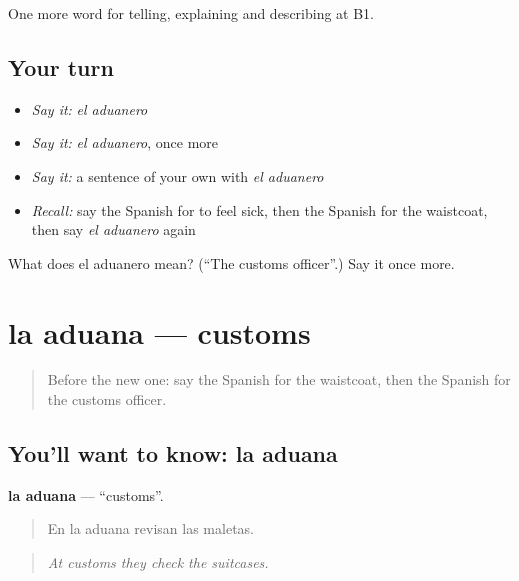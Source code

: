 \begin{grammarlens}[title={What you've built}]
One more word for telling, explaining and describing at B1.
\end{grammarlens}

\subsection*{Your turn}
\begin{itemize}
\raggedright
  \item \emph{Say it:} \emph{el aduanero}
  \item \emph{Say it:} \emph{el aduanero}, once more
  \item \emph{Say it:} a sentence of your own with \emph{el aduanero}
  \item \emph{Recall:} say the Spanish for to feel sick, then the Spanish for the waistcoat, then say \emph{el aduanero} again
\end{itemize}

\begin{tcolorbox}[breakable,colback=teal!4,colframe=teal!35!black,title={Before you move on}]
What does el aduanero mean? (\textquotedblleft{}The customs officer\textquotedblright{}.) Say it once more.
\end{tcolorbox}
\section[la aduana]{la aduana — customs}

\label{lesson:ES-C656-aduana}



\begin{quote}
Before the new one: say the Spanish for the waistcoat, then the Spanish for the customs officer.
\end{quote}

\subsection*{You'll want to know: la aduana}
\textbf{la aduana} — \textquotedblleft{}customs\textquotedblright{}.

\begin{quote}
En la aduana revisan las maletas.
\end{quote}

\begin{quote}
\emph{At customs they check the suitcases.}
\end{quote}


